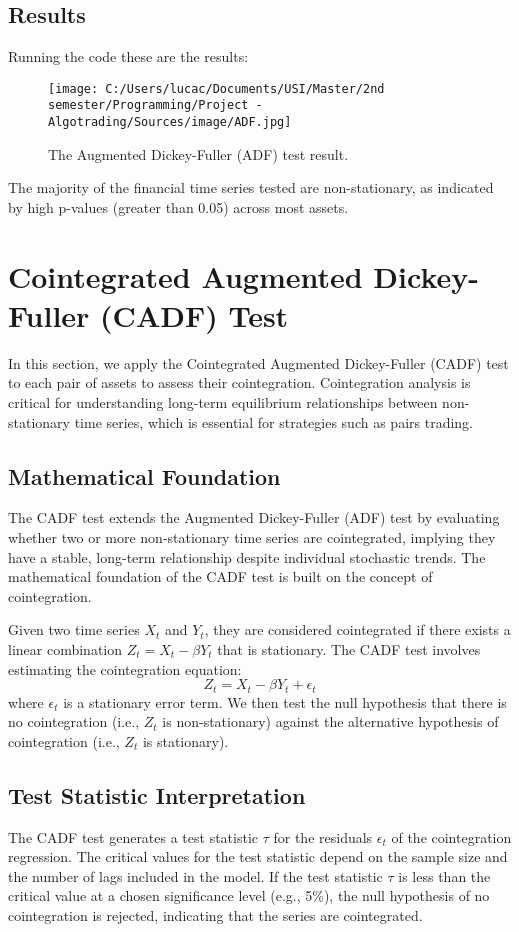 \documentclass{article}
\begin{document}
\subsection*{Results}
Running the code these are the results:
\begin{figure}[h]
    \centering
    \texttt{[image: C:/Users/lucac/Documents/USI/Master/2nd semester/Programming/Project - Algotrading/Sources/image/ADF.jpg]}
    \caption{The Augmented Dickey-Fuller (ADF) test result.}
    \label{fig:ADF}
\end{figure}

The majority of the financial time series tested are non-stationary, as indicated by high p-values (greater than 0.05) across most assets. 

\section*{Cointegrated Augmented Dickey-Fuller (CADF) Test}
In this section, we apply the Cointegrated Augmented Dickey-Fuller (CADF) test to each pair of assets to assess their cointegration. Cointegration analysis is critical for understanding long-term equilibrium relationships between non-stationary time series, which is essential for strategies such as pairs trading.

\subsection{Mathematical Foundation}
The CADF test extends the Augmented Dickey-Fuller (ADF) test by evaluating whether two or more non-stationary time series are cointegrated, implying they have a stable, long-term relationship despite individual stochastic trends. The mathematical foundation of the CADF test is built on the concept of cointegration.

Given two time series \( X_t \) and \( Y_t \), they are considered cointegrated if there exists a linear combination \( Z_t = X_t - \beta Y_t \) that is stationary. The CADF test involves estimating the cointegration equation:
\[
Z_t = X_t - \beta Y_t + \epsilon_t
\]
where \( \epsilon_t \) is a stationary error term. We then test the null hypothesis that there is no cointegration (i.e., \( Z_t \) is non-stationary) against the alternative hypothesis of cointegration (i.e., \( Z_t \) is stationary).

\subsection{Test Statistic Interpretation}
The CADF test generates a test statistic \( \tau \) for the residuals \( \epsilon_t \) of the cointegration regression. The critical values for the test statistic depend on the sample size and the number of lags included in the model. If the test statistic \( \tau \) is less than the critical value at a chosen significance level (e.g., 5\%), the null hypothesis of no cointegration is rejected, indicating that the series are cointegrated.
\end{document}
